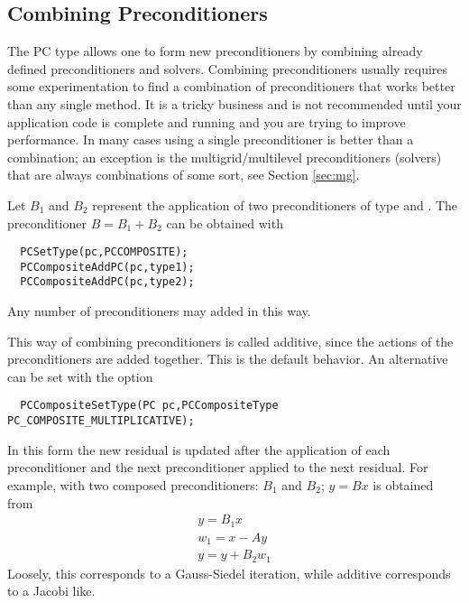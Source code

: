 \subsection{Combining Preconditioners} 

The PC type   allows one to form 
new preconditioners by combining already defined preconditioners and 
solvers. Combining preconditioners usually requires some experimentation
to find a combination of preconditioners that works better than any
single method. It is a tricky business and is not recommended until 
your application code is complete and running and you are trying to 
improve performance. In many cases using a single preconditioner is better
than a combination; an exception is the multigrid/multilevel preconditioners
(solvers) that are always combinations of some sort, see Section \ref{sec:mg}.

Let $B_1$ and $B_2$ represent the application of two 
preconditioners of type  and . The preconditioner
$ B = B_1 + B_2 $ can be obtained with
\begin{verbatim}
  PCSetType(pc,PCCOMPOSITE);
  PCCompositeAddPC(pc,type1);
  PCCompositeAddPC(pc,type2);
\end{verbatim}
Any number of preconditioners may added in this way. 

This way of combining preconditioners is called additive, since 
the actions of the preconditioners are added together. This is the 
default behavior. An alternative can be set with the option
\begin{verbatim}
  PCCompositeSetType(PC pc,PCCompositeType PC_COMPOSITE_MULTIPLICATIVE);
\end{verbatim}
 
  
In this form the new residual is updated after the application of 
each preconditioner and the next preconditioner applied to the next 
residual. For example, with two composed preconditioners: $B_1$ and 
$ B_2$; $ y = B x $ is obtained from
\begin{eqnarray*}
  y    = B_1 x \\
  w_1  = x - A y \\
  y    = y + B_2 w_1 
\end{eqnarray*}
Loosely, this corresponds to a Gauss-Siedel iteration, while
additive corresponds to a Jacobi like.

